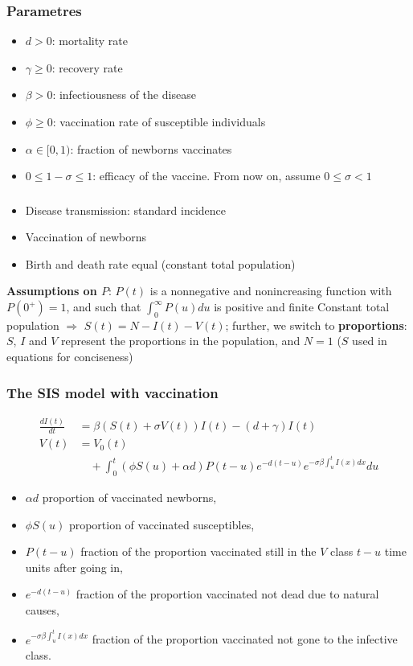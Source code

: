 \documentclass[aspectratio=169]{beamer}\usepackage[]{graphicx}\usepackage[]{xcolor}
\begin{document}
\begin{frame}\frametitle{Parametres}
\begin{itemize}
\item $d> 0$: mortality rate
\vfill
\item $\gamma\geq 0$: recovery rate
\vfill
\item $\beta> 0$: infectiousness of the disease
\vfill
\item $\phi\geq 0$: vaccination rate of susceptible individuals
\vfill
\item $\alpha\in[0,1)$: fraction of newborns vaccinates
\vfill
\item $0\leq 1-\sigma\leq 1$: efficacy of the vaccine. From now on, assume $0\leq \sigma< 1$
\end{itemize}
\end{frame}


\begin{frame}\frametitle{}
\begin{itemize}
\item Disease transmission: standard incidence
\vfill
\item Vaccination of newborns
\vfill
\item Birth and death rate equal (\imply constant total population)
\end{itemize}

\textbf{Assumptions on $P$}: $P(t)$ is a nonnegative and nonincreasing
function with $P(0^+)=1$, and such that $\int_0^\infty P(u)du$ is
positive and finite
\vfill
Constant total population $\Rightarrow$ $S(t)=N-I(t)-V(t)$; further, we
switch to \textbf{proportions}: $S$, $I$ and $V$ represent the
proportions in the population, and $N=1$ ($S$ used in equations for
conciseness)
\end{frame}

\begin{frame}\frametitle{The SIS model with vaccination} 
\begin{subequations}\label{sys:SIVS_general}
\begin{align}
  \frac{dI(t)}{dt}&= \beta(S(t)+\sigma V(t))I(t)-(d+\gamma)I(t)
  \label{sys:SIVS_general_I}\\ 
  V(t)&= V_0(t) \label{sys:SIVS_general_V} \\
  &\quad +\int_0^t(\phi S(u)+\alpha d)P(t-u)e^{-d(t-u)}
  e^{-\sigma\beta\int_u^tI(x)dx}du \nonumber
\end{align}
\end{subequations}
\vfill
\begin{itemize}
\item $\alpha d$ proportion of vaccinated newborns,
\item $\phi S(u)$ proportion of vaccinated susceptibles, 
\item $P(t-u)$ fraction of the proportion vaccinated still in the $V$
  class $t-u$ time units after going in,
\item $e^{-d(t-u)}$ fraction of the proportion vaccinated
not dead due to natural causes,
\item $e^{-\sigma\beta\int_u^t I(x)dx}$ fraction of the proportion
  vaccinated not gone to the infective class.
\end{itemize} 
\end{frame}
\end{document}
